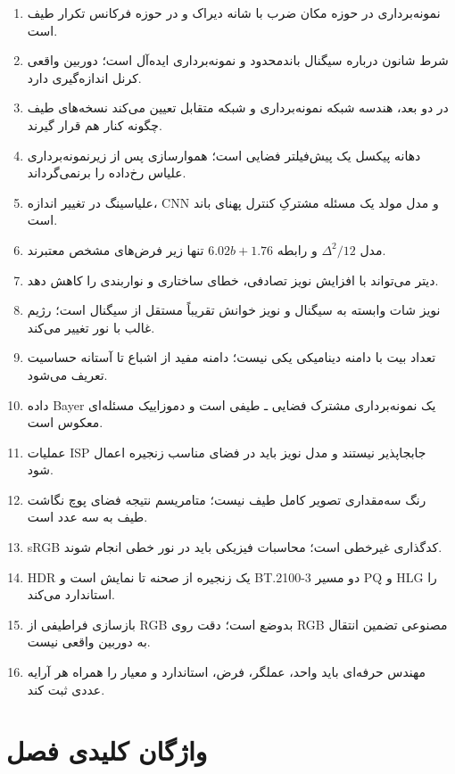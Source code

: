 \documentclass[12pt,openany,oneside]{book}
\begin{document}
\begin{enumerate}
\item نمونه‌برداری در حوزه مکان ضرب با شانه دیراک و در حوزه فرکانس تکرار طیف است.
\item شرط شانون درباره سیگنال باند‌محدود و نمونه‌برداری ایده‌آل است؛ دوربین واقعی کرنل اندازه‌گیری دارد.
\item در دو بعد، هندسه شبکه نمونه‌برداری و شبکه متقابل تعیین می‌کند نسخه‌های طیف چگونه کنار هم قرار گیرند.
\item دهانه پیکسل یک پیش‌فیلتر فضایی است؛ هموارسازی پس از زیرنمونه‌برداری علیاس رخ‌داده را برنمی‌گرداند.
\item علیاسینگ در تغییر اندازه، CNN و مدل مولد یک مسئله مشترکِ کنترل پهنای باند است.
\item مدل \(\Delta^2/12\) و رابطه \(6.02b+1.76\) تنها زیر فرض‌های مشخص معتبرند.
\item دیتر می‌تواند با افزایش نویز تصادفی، خطای ساختاری و نواربندی را کاهش دهد.
\item نویز شات وابسته به سیگنال و نویز خوانش تقریباً مستقل از سیگنال است؛ رژیم غالب با نور تغییر می‌کند.
\item تعداد بیت با دامنه دینامیکی یکی نیست؛ دامنه مفید از اشباع تا آستانه حساسیت تعریف می‌شود.
\item داده Bayer یک نمونه‌برداری مشترک فضایی ـ طیفی است و دموزاییک مسئله‌ای معکوس است.
\item عملیات ISP جابجاپذیر نیستند و مدل نویز باید در فضای مناسب زنجیره اعمال شود.
\item رنگ سه‌مقداری تصویر کامل طیف نیست؛ متامریسم نتیجه فضای پوچ نگاشت طیف به سه عدد است.
\item sRGB کدگذاری غیرخطی است؛ محاسبات فیزیکی باید در نور خطی انجام شوند.
\item HDR یک زنجیره از صحنه تا نمایش است و BT.2100-3 دو مسیر PQ و HLG را استاندارد می‌کند.
\item بازسازی فراطیفی از RGB بدوضع است؛ دقت روی RGB مصنوعی تضمین انتقال به دوربین واقعی نیست.
\item مهندس حرفه‌ای باید واحد، عملگر، فرض، استاندارد و معیار را همراه هر آرایه عددی ثبت کند.
\end{enumerate}

\section{واژگان کلیدی فصل}
\end{document}
